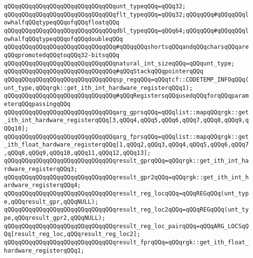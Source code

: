 \newline
\verb|qQQqqQQqqQQqqQQqqQQqqQQqqQQqqQQqunt_typeqQQq=qQQq32;|\newline
\verb|qQQqqQQqqQQqqQQqqQQqqQQqqQQqqQQqflt_typeqQQq=qQQq32;qQQqqQQq#qQQqqQQqlowhalfqQQqtypeqQQqofqQQqfloatqQQq|\newline
\verb|qQQqqQQqqQQqqQQqqQQqqQQqqQQqqQQqdbl_typeqQQq=qQQq64;qQQqqQQq#qQQqqQQqlowhalfqQQqtypeqQQqofqQQqdoubleqQQq|\newline
\newline
\verb|qQQqqQQqqQQqqQQqqQQqqQQqqQQqqQQq#qQQqqQQqshortsqQQqandqQQqcharsqQQqareqQQqpromotedqQQqtoqQQq32-bitsqQQq|\newline
\verb|qQQqqQQqqQQqqQQqqQQqqQQqqQQqqQQqnatural_int_sizeqQQq=qQQqunt_type;|\newline
\newline
\verb|qQQqqQQqqQQqqQQqqQQqqQQqqQQqqQQq#qQQqStackqQQqpointerqQQq|\newline
\verb|qQQqqQQqqQQqqQQqqQQqqQQqqQQqqQQqsp_regqQQq=qQQqtcf::CODETEMP_INFOqQQq(unt_type,qQQqrgk::get_ith_int_hardware_registerqQQq1);|\newline
\newline
\verb|qQQqqQQqqQQqqQQqqQQqqQQqqQQqqQQq#qQQqRegistersqQQqusedqQQqforqQQqparameterqQQqpassingqQQq|\newline
\verb|qQQqqQQqqQQqqQQqqQQqqQQqqQQqqQQqarg_gprsqQQq=qQQqlist::mapqQQqrgk::get_ith_int_hardware_registerqQQq[3,qQQq4,qQQq5,qQQq6,qQQq7,qQQq8,qQQq9,qQQq10];|\newline
\verb|qQQqqQQqqQQqqQQqqQQqqQQqqQQqqQQqarg_fprsqQQq=qQQqlist::mapqQQqrgk::get_ith_float_hardware_registerqQQq[1,qQQq2,qQQq3,qQQq4,qQQq5,qQQq6,qQQq7,qQQq8,qQQq9,qQQq10,qQQq11,qQQq12,qQQq13];|\newline
\verb|qQQqqQQqqQQqqQQqqQQqqQQqqQQqqQQqresult_gprqQQq=qQQqrgk::get_ith_int_hardware_registerqQQq3;|\newline
\verb|qQQqqQQqqQQqqQQqqQQqqQQqqQQqqQQqresult_gpr2qQQq=qQQqrgk::get_ith_int_hardware_registerqQQq4;|\newline
\verb|qQQqqQQqqQQqqQQqqQQqqQQqqQQqqQQqresult_reg_locqQQq=qQQqREGqQQq(unt_type,qQQqresult_gpr,qQQqNULL);|\newline
\verb|qQQqqQQqqQQqqQQqqQQqqQQqqQQqqQQqresult_reg_loc2qQQq=qQQqREGqQQq(unt_type,qQQqresult_gpr2,qQQqNULL);|\newline
\verb|qQQqqQQqqQQqqQQqqQQqqQQqqQQqqQQqresult_reg_loc_pairqQQq=qQQqARG_LOCSqQQq[result_reg_loc,qQQqresult_reg_loc2];|\newline
\verb|qQQqqQQqqQQqqQQqqQQqqQQqqQQqqQQqresult_fprqQQq=qQQqrgk::get_ith_float_hardware_registerqQQq1;|\newline
